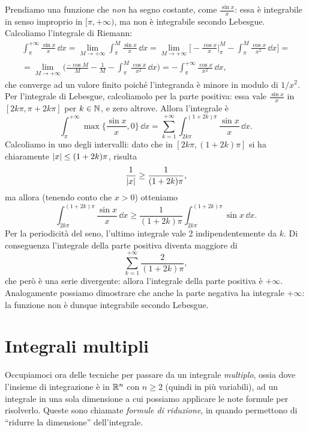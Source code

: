 Prendiamo una funzione che \emph{non} ha segno costante, come $\frac{\sin x}{x}$: essa è integrabile in senso improprio in $[\pi,+\infty)$, ma non è integrabile secondo Lebesgue.
Calcoliamo l'integrale di Riemann:
\begin{multline}
	\int_\pi^{+\infty}\frac{\sin x}{x}\,\dd x=\lim_{M\to+\infty}\int_\pi^M\frac{\sin x}{x}\,\dd x=\lim_{M\to+\infty}\bigg[-\frac{\cos x}{x}\Big|_\pi^M-\int_\pi^M\frac{\cos x}{x^2}\,\dd x\bigg]=\\
	=\lim_{M\to+\infty}\bigg(\frac{-\cos M}{M}-\frac1{M}-\int_\pi^M\frac{\cos x}{x^2}\,\dd x\bigg)=-\int_\pi^{+\infty}\frac{\cos x}{x^2}\,\dd x,
\end{multline}
che converge ad un valore finito poich\'e l'integranda è minore in modulo di $1/x^2$.
Per l'integrale di Lebesgue, calcoliamolo per la parte positiva: essa vale $\frac{\sin x}{x}$ in $[2k\pi,\pi+2k\pi]$ per $k\in\mathbb{N}$, e zero altrove. 
Allora l'integrale è
\begin{equation}
	\int_\pi^{+\infty}\max\Big\{\frac{\sin x}{x},0\Big\}\,\dd x=\sum_{k=1}^{+\infty}\int_{2k\pi}^{(1+2k)\pi}\frac{\sin x}{x}\,\dd x.
\end{equation}
Calcoliamo in uno degli intervalli: dato che in $[2k\pi,(1+2k)\pi]$ si ha chiaramente $\lvert x\rvert\leq(1+2k)\pi$, risulta
\begin{equation*}
	\frac1{\lvert x\rvert}\geq\frac1{(1+2k)\pi},
\end{equation*}
ma allora (tenendo conto che $x>0$) otteniamo
\begin{equation}
	\int_{2k\pi}^{(1+2k)\pi}\frac{\sin x}{x}\,\dd x\geq\frac1{(1+2k)\pi}\int_{2k\pi}^{(1+2k)\pi}\sin x\,\dd x.
\end{equation}
Per la periodicità del seno, l'ultimo integrale vale 2 indipendentemente da $k$.
Di conseguenza l'integrale della parte positiva diventa maggiore di
\begin{equation*}
	\sum_{k=1}^{+\infty}\frac2{(1+2k)\pi},
\end{equation*}
che però è una serie divergente: allora l'integrale della parte positiva è $+\infty$.
Analogamente possiamo dimostrare che anche la parte negativa ha integrale $+\infty$: la funzione non è dunque integrabile secondo Lebesgue.

\section{Integrali multipli}
Occupiamoci ora delle tecniche per passare da un integrale \emph{multiplo}, ossia dove l'insieme di integrazione è in $\mathbb{R}^n$ con $n\geq 2$ (quindi in più variabili), ad un integrale in una sola dimensione a cui possiamo applicare le note formule per risolverlo.
Queste sono chiamate \emph{formule di riduzione}, in quando permettono di ``ridurre la dimensione'' dell'integrale.

